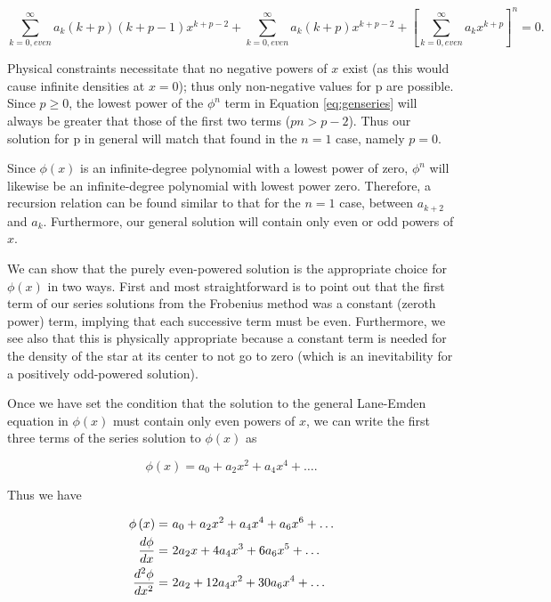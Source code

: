 \documentclass[12pt, manuscript]{article}
\begin{document}
\begin{equation}
\sum_{k=0,even}^{\infty}a_k\left(k+p\right)\left(k+p-1\right)x^{k+p-2}+\sum_{k=0,even}^{\infty}a_k\left(k+p\right)x^{k+p-2}+\left[\sum_{k=0,even}^{\infty}a_kx^{k+p}\right]^n=0.\label{eq:genseries}
\end{equation}

Physical constraints necessitate that no negative powers of $x$ exist (as this would cause infinite densities at $x=0$); thus only non-negative values for p are possible. Since $p \geq 0$, the lowest power of the $\phi^n$ term in Equation \eqref{eq:genseries} will always be greater that those of the first two terms ($pn > p-2$). Thus our solution for p in general will match that found in the $n=1$ case, namely $p=0$.

Since $\phi\left(x\right)$ is an infinite-degree polynomial with a lowest power of zero, $\phi^n$ will likewise be an infinite-degree polynomial with lowest power zero. Therefore, a recursion relation can be found similar to that for the $n=1$ case, between $a_{k+2}$ and $a_{k}$. Furthermore, our general solution will contain only even or odd powers of $x$.

We can show that the purely even-powered solution is the appropriate choice for $\phi \left( x \right)$ in two ways. First and most straightforward is to point out that the first term of our series solutions from the Frobenius method was a constant (zeroth power) term, implying that each successive term must be even. Furthermore, we see also that this is physically appropriate because a constant term is needed for the density of the star at its center to not go to zero (which is an inevitability for a positively odd-powered solution).  

Once we have set the condition that the solution to the general Lane-Emden equation in $\phi \left( x \right)$ must contain only even powers of $x$, we can write the first three terms of the series solution to $\phi \left( x \right)$ as

\begin{equation}
\phi \left( x \right) = a_0 + a_2x^2 + a_4x^4 + \dots.
\end{equation}

Thus we have

\begin{align}
\phi \left( x \right) = &\ a_0 + a_2x^2 + a_4x^4 + a_6x^6 + \dots \notag \\
\frac{d\phi}{dx} = &\ 2a_2x + 4a_4x^3 + 6a_6x^5 + \dots  \label{eq:lesf} \\
\frac{d^2\phi}{dx^2} =  &\ 2a_2 + 12a_4x^2 + 30a_6x^4 + \notag \dots
\end{align}
\end{document}
